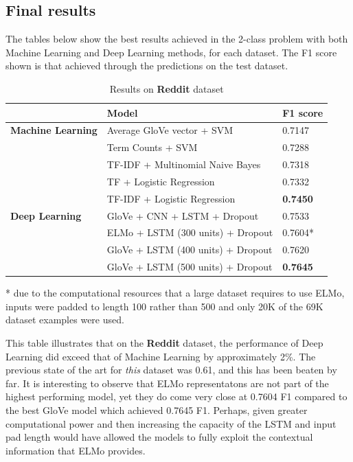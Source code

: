 \documentclass[12pt,a4paper]{article}
\begin{document}


\subsection{Final results}
The tables below show the best results achieved in the 2-class problem with both Machine Learning and Deep Learning methods, for each dataset. The F1 score shown is that achieved through the predictions on the test dataset.

\begin{table}[H]
	\centering
	\vspace*{-18pt}
	\caption{Results on \textbf{Reddit} dataset}
	\label{results1}
	\hspace*{-0.8cm}
	\begin{tabular}{p{3.4cm} p{10cm} p{3cm}} \hline\hline
		& \textbf{Model} & \textbf{F1 score}  \\ \hline
		
		\textbf{Machine Learning} & Average GloVe vector + SVM & 0.7147 \\
		& Term Counts + SVM & 0.7288 \\
		& TF-IDF + Multinomial Naive Bayes & 0.7318 \\ 
		& TF + Logistic Regression & 0.7332 \\
		& TF-IDF + Logistic Regression & \textbf{0.7450} \\ \hline
		
		\textbf{Deep Learning} & GloVe + CNN + LSTM + Dropout & 0.7533 \\
		& ELMo + LSTM (300 units) + Dropout & 0.7604* \\
		& GloVe + LSTM (400 units) + Dropout & 0.7620 \\
		& GloVe + LSTM (500 units) + Dropout & \textbf{0.7645} \\ \hline
	\end{tabular}
\end{table}

* due to the computational resources that a large dataset requires to use ELMo, inputs were padded to length 100 rather than 500 and only 20K of the 69K dataset examples were used. \newline

This table illustrates that on the \textbf{Reddit} dataset, the performance of Deep Learning did exceed that of Machine Learning by approximately 2\%. The previous state of the art for \textit{this} dataset was 0.61, and this has been beaten by far. It is interesting to observe that ELMo representatons are not part of the highest performing model, yet they do come very close at 0.7604 F1 compared to the best GloVe model which achieved 0.7645 F1. Perhaps, given greater computational power and then increasing the capacity of the LSTM and input pad length would have allowed the models to fully exploit the contextual information that ELMo provides.
\end{document}
